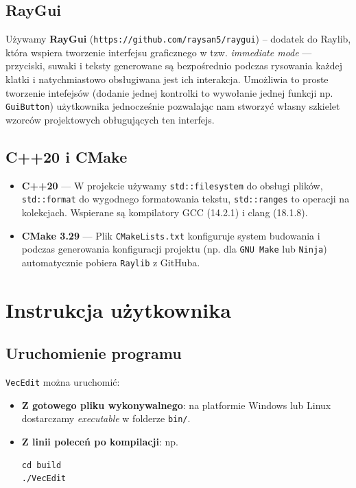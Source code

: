\documentclass[a4paper,12pt]{article}
\begin{document}
\subsection{RayGui} 

Używamy \textbf{RayGui} (\verb|https://github.com/raysan5/raygui|) -- dodatek do Raylib, która wspiera tworzenie interfejsu
graficznego w tzw. \emph{immediate mode} — przyciski, suwaki i teksty
generowane są bezpośrednio podczas rysowania każdej klatki i natychmiastowo
obsługiwana jest ich interakcja. Umożliwia to proste tworzenie intefejsów
(dodanie jednej kontrolki to wywołanie jednej funkcji np. \texttt{GuiButton})
użytkownika jednocześnie pozwalając nam stworzyć własny szkielet wzorców
projektowych obługujących ten interfejs.

\subsection{C++20 i CMake}
\begin{itemize}
    \item \textbf{C++20} — W projekcie używamy \texttt{std::filesystem} do
      obsługi plików, \texttt{std::format} do wygodnego formatowania tekstu,
      \texttt{std::ranges} to operacji na kolekcjach. Wspierane są kompilatory
      GCC (14.2.1) i clang (18.1.8).

    \item \textbf{CMake 3.29} — Plik \texttt{CMakeLists.txt} konfiguruje system
      budowania i podczas generowania konfiguracji projektu (np. dla
      \texttt{GNU Make} lub \texttt{Ninja}) automatycznie pobiera
      \texttt{Raylib} z GitHuba.
\end{itemize}

\section{Instrukcja użytkownika}

\subsection{Uruchomienie programu}
\texttt{VecEdit} można uruchomić:
\begin{itemize}
    \item \textbf{Z gotowego pliku wykonywalnego}: na platformie Windows lub Linux
    dostarczamy \emph{executable} w folderze \texttt{bin/}.
    \item \textbf{Z linii poleceń po kompilacji}: np.
\begin{verbatim}
cd build
./VecEdit
\end{verbatim}
\end{itemize}
\end{document}
